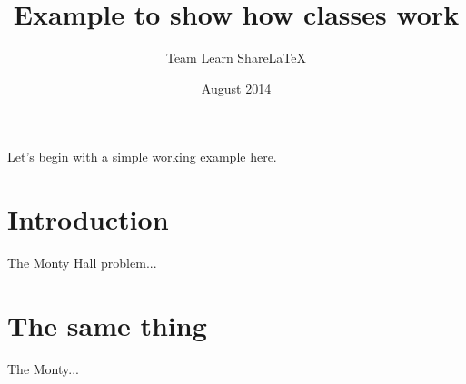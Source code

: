 \documentclass[red]{classExample}
\title{Example to show how classes work}
\author{Team Learn ShareLaTeX}
\date{August 2014}
\begin{document}
	
	\maketitle
	
	\noindent
	Let's begin with a simple working example here.
	
	\blindtext
	
	\section{Introduction}
	
	The Monty Hall problem...
	
	\section{The same thing}
	
	The Monty...
\end{document}

